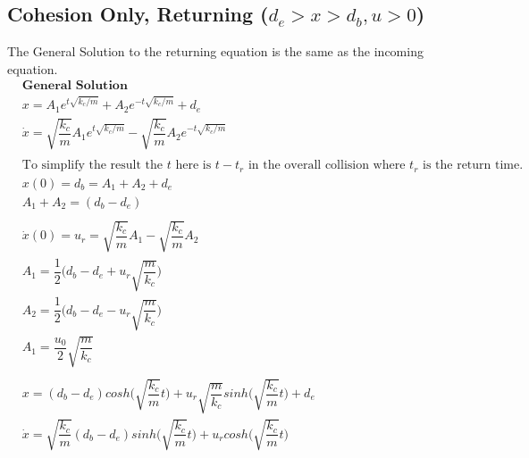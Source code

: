 \documentclass[10pt,a4paper,titlepage]{report}
\begin{document}
\subsection{Cohesion Only, Returning ($d_e > x > d_b, u > 0$)}
The General Solution to the returning equation is the same as the incoming equation.
\begin{align*}
&\textbf{General Solution} \\
&x = A_1 e^{t \sqrt{k_c / m}} + A_2 e^{- t \sqrt{k_c / m}} + d_e \\
&\dot{x} = \sqrt{\dfrac{k_c}{m}} A_1 e^{t \sqrt{k_c / m}} - \sqrt{\dfrac{k_c}{m}} A_2 e^{- t \sqrt{k_c / m}} \\\\
&\text{To simplify the result the $t$ here is $t - t_r$ in the overall collision where $t_r$ is the return time.} \\
&x(0) = d_b = A_1 + A_2 + d_e \\
&A_1 + A_2 = (d_b - d_e)\\\\
&\dot{x}(0) = u_r = \sqrt{\dfrac{k_c}{m}} A_1 - \sqrt{\dfrac{k_c}{m}} A_2 \\
&A_1 = \dfrac{1}{2}\Big(d_b - d_e + u_r \sqrt{\dfrac{m}{k_c}} \Big) \\
&A_2 = \dfrac{1}{2}\Big(d_b - d_e - u_r \sqrt{\dfrac{m}{k_c}} \Big) \\
&A_1 = \dfrac{u_0}{2} \sqrt{\dfrac{m}{k_c}} \\\\
&x = (d_b - d_e)cosh\Big(\sqrt{\dfrac{k_c}{m}} t\Big) + u_r \sqrt{\dfrac{m}{k_c}} sinh\Big(\sqrt{\dfrac{k_c}{m}}t\Big) + d_e \\
&\dot{x} = \sqrt{\dfrac{k_c}{m}}(d_b - d_e)sinh\Big(\sqrt{\dfrac{k_c}{m}} t\Big) + u_r cosh\Big(\sqrt{\dfrac{k_c}{m}}t\Big) \\
\end{align*}
\end{document}
